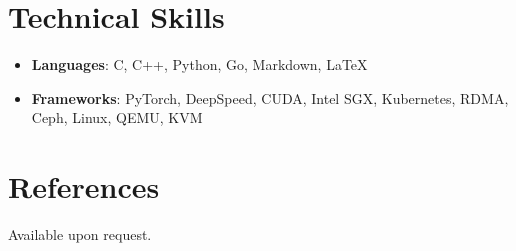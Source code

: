 \documentclass[letterpaper,oneside,11pt]{article}
\newcommand{\resumeItem}[2]{
  \item\small{
    \textbf{#1}{: #2 \vspace{-3pt}}
  }
}
\newcommand{\resumeSubHeadingListStart}{\begin{itemize}[leftmargin=*]}
\newcommand{\resumeSubHeadingListEnd}{\end{itemize}}
\begin{document}
%
\section{Technical Skills}
 \resumeSubHeadingListStart
  \resumeItem{Languages}{C, C++, Python, Go, Markdown, \LaTeX}
  \resumeItem{Frameworks}{PyTorch, DeepSpeed, CUDA, Intel SGX, Kubernetes, RDMA, Ceph, Linux, QEMU, KVM}
 \resumeSubHeadingListEnd

\section{References}
Available upon request.
\end{document}

